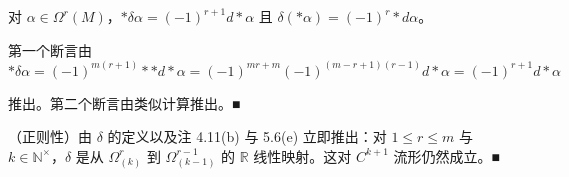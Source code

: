 \begin{remark}
\begin{items}
对 $ \alpha \in \Omega^{r}(M) $，$ \ast\delta\alpha = (-1)^{r+1}d\ast\alpha $ 且 $ \delta(\ast\alpha) = (-1)^{r}\ast d\alpha $。

\proofhead
第一个断言由
\[
\ast\delta\alpha = (-1)^{m(r+1)}\ast\ast d\ast\alpha = (-1)^{mr+m}(-1)^{(m-r+1)(r-1)}d\ast\alpha = (-1)^{r+1}d\ast\alpha
\]

推出。第二个断言由类似计算推出。\nobreak\hspace{0.35em}■

\item

（正则性）由 $ \delta $ 的定义以及注 4.11(b) 与 5.6(e) 立即推出：对 $ 1 \le r \le m $ 与 $ k \in \mathbb{N}^{\times} $，$ \delta $ 是从 $ \Omega^{r}_{(k)} $ 到 $ \Omega^{r-1}_{(k-1)} $ 的 $ \mathbb{R} $ 线性映射。这对 $ C^{k+1} $ 流形仍然成立。\nobreak\hspace{0.35em}■

\end{items}

\end{remark}

